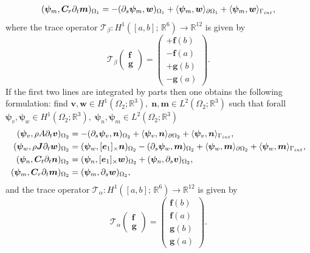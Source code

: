 \documentclass[11pt,a4paper]{article}
\newcommand{\innerproduct}[3][\Omega]{(#2, #3)_{#1}}
\newcommand{\boundary}[3][\partial\Omega]{\langle #2, #3\rangle_{#1}}
\begin{document}
{\begin{equation}
\begin{aligned}
    \innerproduct[\Omega_1]{\bm{\psi}_m}{\bm{C}_r \partial_t \bm{m}} &= - \innerproduct[\Omega_1]{\partial_s \bm{\psi}_m}{ \bm{w}} + \boundary[\partial \Omega_1]{\bm{\psi}_m }{\bm{w}} + \boundary[\Gamma_{\rm int}]{\bm{\psi}_m }{\bm{w}}, \\  
\end{aligned}
\end{equation}
where the trace operator $\mathcal{T}_\beta : H^1([a, b]; \, \mathbb{R}^6) \rightarrow \mathbb{R}^{12}$ is given by
$$
\mathcal{T}_\beta\begin{pmatrix}
    \bm{f} \\ \bm{g}
\end{pmatrix} = \begin{pmatrix}
    +\bm{f}(b) \\ -\bm{f}(a) \\ +\bm{g}(b) \\ -\bm{g}(a)
\end{pmatrix}.
$$
If the first two lines are integrated by parts then one obtains the following formulation: find $\bm{v}, \bm{w} \in H^1(\Omega_2; \mathbb{R}^3), \; \bm{n}, \bm{m} \in L^2(\Omega_2; \mathbb{R}^3)$ such that forall $\bm{\psi}_v, \bm{\psi}_w \in H^1(\Omega_2; \mathbb{R}^3), \; \bm{\psi}_n, \bm{\psi}_m \in L^2(\Omega_2; \mathbb{R}^3)$
\begin{equation}
\begin{aligned}
    \innerproduct[\Omega_2]{\bm{\psi}_v}{\rho A \partial_t \bm{v}} &= - \innerproduct[\Omega_2]{\partial_s  \bm{\psi}_v}{\bm{n}} + \boundary[\partial \Omega_2]{\bm{\psi}_v}{\bm{n}} + \boundary[\Gamma_{\rm int}]{\bm{\psi}_v}{\bm{n}}, \\
    \innerproduct[\Omega_2]{\bm{\psi}_w}{\rho \bm{J} \partial_t \bm{w}} &= \innerproduct[\Omega_2]{\bm{\psi}_w}{[\bm{e}_1]_{\times} \bm{n}} - \innerproduct[\Omega_2]{\partial_s \bm{\psi}_w}{\bm{m}} + \boundary[\partial \Omega_2]{\bm{\psi}_w}{\bm{m}} + \boundary[\Gamma_{\rm int}]{\bm{\psi}_w}{\bm{m}}, \\
    \innerproduct[\Omega_2]{\bm{\psi}_n}{\bm{C}_t \partial_t \bm{n}} &= \innerproduct[\Omega_2]{\bm{\psi}_n}{[\bm{e}_1]_{\times} \bm{w}} + \innerproduct[\Omega_2]{\bm{\psi}_n}{\partial_s \bm{v}}, \\
    \innerproduct[\Omega_2]{\bm{\psi}_m}{\bm{C}_r \partial_t \bm{m}} &= \innerproduct[\Omega_2]{\bm{\psi}_m}{\partial_s \bm{w}}, \\    
\end{aligned}
\end{equation}
and the trace operator $\mathcal{T}_\alpha : H^1([a, b]; \, \mathbb{R}^6) \rightarrow \mathbb{R}^{12}$ is given by
$$
\mathcal{T}_\alpha\begin{pmatrix}
    \bm{f} \\ \bm{g}
\end{pmatrix} = \begin{pmatrix}
    \bm{f}(b) \\ \bm{f}(a) \\ \bm{g}(b) \\ \bm{g}(a)
\end{pmatrix}.
$$
}
\end{document}
